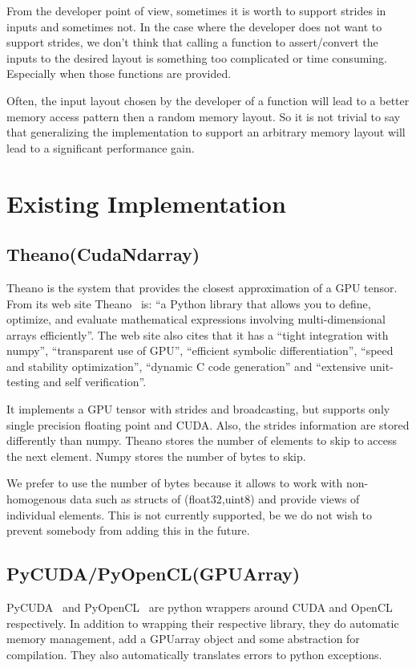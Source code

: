 \documentclass{article} %
\begin{document}
From the developer point of view, sometimes it is worth to support
strides in inputs and sometimes not.  In the case where the developer does not want to support strides, we don't think
that calling a function to assert/convert the inputs to the desired layout is something too complicated or time consuming.
Especially when those functions are provided.

Often, the input layout chosen by the developer of a function
will lead to a better memory access pattern then a random memory
layout. So it is not trivial to say that generalizing the
implementation to support an arbitrary memory layout will lead to a
significant performance gain. 

\section{Existing Implementation}
\subsection{Theano(CudaNdarray)}
Theano is the system that provides the closest approximation of a GPU tensor. From its web site Theano~\citep{bergstra+al:2010-scipy} is:
``a Python library that allows you to define, optimize, and evaluate mathematical expressions involving multi-dimensional arrays efficiently''. The web site also cites that it has a ``tight integration with numpy'', ``transparent use of GPU'', ``efficient symbolic differentiation'', ``speed and stability optimization'', ``dynamic C code generation'' and ``extensive unit-testing and self verification''.

It implements a GPU tensor with strides and broadcasting, but supports only single precision floating point and CUDA. Also, the strides information are stored differently than numpy. Theano stores the number of elements to skip to access the next element. Numpy stores the number of bytes to skip.

We prefer to use the number of bytes because it allows to work with non-homogenous data such as structs of (float32,uint8) and provide views of individual elements.  This is not currently supported, be we do not wish to prevent somebody from adding this in the future.

\subsection{PyCUDA/PyOpenCL(GPUArray)}
PyCUDA~\citep{kloeckner_pycuda_2009} and PyOpenCL~\citep{kloeckner_pycuda_2009} are python wrappers around CUDA and OpenCL respectively. In addition to wrapping their respective library, they do automatic memory management, add a GPUarray object and some abstraction for compilation. They also automatically translates errors to python exceptions.
\end{document}
